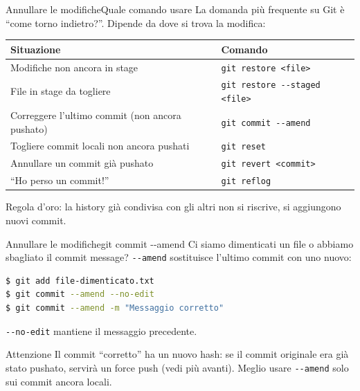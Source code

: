 \documentclass[aspectratio=169,handout,10pt]{beamer}
\begin{document}
\begin{frame}[fragile]{Annullare le modifiche}{Quale comando usare}
    La domanda più frequente su Git è ``come torno indietro?''. Dipende da dove si trova la modifica:
    \begin{table}
        \small
        \begin{tabular}{|p{}|p{}|}
            \hline \textbf{Situazione} & \textbf{Comando} \\
            \hline Modifiche non ancora in stage & \lstinline{git restore <file>} \\
            \hline File in stage da togliere & \lstinline{git restore --staged <file>} \\
            \hline Correggere l'ultimo commit (non ancora pushato) & \lstinline{git commit --amend} \\
            \hline Togliere commit locali non ancora pushati & \lstinline{git reset} \\
            \hline Annullare un commit già pushato & \lstinline{git revert <commit>} \\
            \hline ``Ho perso un commit!'' & \lstinline{git reflog} \\
            \hline
        \end{tabular}
    \end{table}
    Regola d'oro: la history già condivisa con gli altri non si riscrive, si aggiungono nuovi commit.
\end{frame}
\begin{frame}[fragile]{Annullare le modifiche}{git commit -{}-amend}
    Ci siamo dimenticati un file o abbiamo sbagliato il commit message? \lstinline{--amend} sostituisce l'ultimo commit con uno nuovo:
    \begin{lstlisting}[language=bash]
$ git add file-dimenticato.txt
$ git commit --amend --no-edit
$ git commit --amend -m "Messaggio corretto"\end{lstlisting}
    \lstinline{--no-edit} mantiene il messaggio precedente.

    \begin{alertblock}{Attenzione}
        Il commit ``corretto'' ha un nuovo hash: se il commit originale era già stato pushato, servirà un force push (vedi più avanti). Meglio usare \lstinline{--amend} solo sui commit ancora locali.
    \end{alertblock}
\end{frame}
\end{document}
